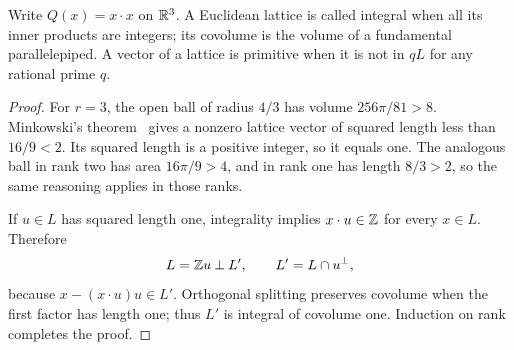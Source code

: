 Write $Q(x)=x\cdot x$ on $\mathbb R^3$. A Euclidean lattice is called integral when
all its inner products are integers; its covolume is the volume of a
fundamental parallelepiped. A vector of a lattice is primitive when it is
not in $qL$ for any rational prime $q$.

\begin{proof}
For $r=3$, the open ball of radius $4/3$ has volume
$256\pi/81>8$. Minkowski's theorem~\cite{minkowski} gives a nonzero lattice vector of
squared length less than $16/9<2$. Its squared length is a positive
integer, so it equals one. The analogous ball in rank two has area
$16\pi/9>4$, and in rank one has length $8/3>2$, so the same reasoning
applies in those ranks.

If $u\in L$ has squared length one, integrality implies
$x\cdot u\in\mathbb Z$ for every $x\in L$. Therefore
\[
 L=\mathbb Z u\mathbin{\perp}L',\qquad L'=L\cap u^\perp,
\]
because $x-(x\cdot u)u\in L'$. Orthogonal splitting preserves covolume
when the first factor has length one; thus $L'$ is integral of covolume
one. Induction on rank completes the proof.
\end{proof}


